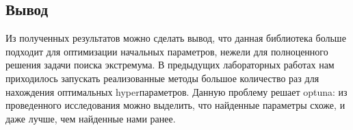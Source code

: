 \documentclass{article}
\begin{document}
\subsection*{Вывод}
Из полученных результатов можно сделать вывод, что данная 
библиотека больше подходит для оптимизации начальных параметров, нежели для полноценного решения задачи поиска экстремума. В предыдущих лабораторных работах нам приходилось запускать реализованные методы большое количество раз для нахождения оптимальных hyperпараметров. Данную проблему решает optuna: из проведенного исследования можно выделить, что найденные параметры схоже, и даже лучше, чем найденные нами ранее.
\end{document}
